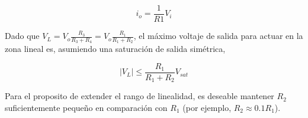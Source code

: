 \begin{equation}
    \boxed{i_o = \frac{1}{R1} V_i}
    \label{eq:mt-io-fuente-corriente}
\end{equation}

Dado que $V_L = V_o \frac{R_3}{R_3 + R_4} = V_o \frac{R_1}{R_1 + R_2}$, el máximo  voltaje de salida para actuar en la zona lineal es, asumiendo una saturación de salida simétrica,  

\begin{equation}
    \left| V_L \right| \leq  \frac{R_1}{R_1 + R_2} V_{sat}
\end{equation}

Para el proposito de extender el rango de linealidad, es deseable mantener $R_2$ suficientemente pequeño en comparación	con $R_1$ (por ejemplo, $R_2 \approx 0.1 R_1$).